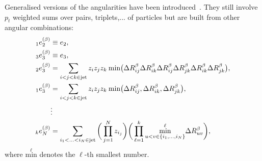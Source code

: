 Generalised versions of the
angularities have been introduced~\cite{Moult:2016cvt}. They still involve $p_t$ weighted
sums over pairs, triplets,... of particles but are built from other
angular combinations:
\begin{align}
  {}_1e_2^{(\beta)} &\equiv e_2,\\
  {}_3e_3^{(\beta)} &\equiv e_3,\\
  {}_2e_3^{(\beta)} &= \sum_{i<j<k\in{\text{jet}}} z_i z_j z_k
            \:\text{min}\big(
            \Delta R_{ij}^\beta \Delta R_{ik}^\beta
            \Delta R_{ij}^\beta \Delta R_{jk}^\beta
            \Delta R_{ik}^\beta \Delta R_{jk}^\beta\big), \\
  {}_1e_3^{(\beta)} &= \sum_{i<j<k\in{\text{jet}}} z_i z_j z_k
            \:\text{min}\big(
            \Delta R_{ij}^\beta,\Delta R_{ik}^\beta,\Delta R_{jk}^\beta\big), \\
 &\vdots\nonumber\\
  {}_ke_N^{(\beta)} &= \sum_{i_1<...<i_N\in{\text{jet}}} \bigg(\prod_{j=1}^Nz_{i_j}\bigg)
                \bigg(\prod_{\ell=1}^k
            \underset{u<v\in\{i_1,...,i_N\}}{\overset{\ell}{\text{min}}} \Delta R_{uv}^\beta\bigg),
\end{align}
where $\overset{\ell}{\text{min}}$ denotes the $\ell$-th smallest number.

